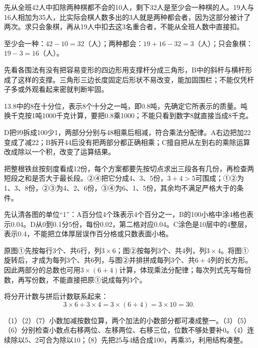 \documentclass[multi=snippet,border=0pt]{standalone}
\newenvironment{snippet}[3]{\begin{minipage}{#1bp}\color{answerred}\fontsize{#2}{#3}\selectfont\raggedright}{\end{minipage}}
\begin{document}
\begin{snippet}{505}{11.5}{14}先从全班42人中扣除两种棋都不会的10人，剩下32人是至少会一种棋的人。19人与16人相加为35人，比实际会棋人数多出的3人就是两种都会者，因为这部分被计了两次。求只会象棋，再从19人中扣去这3名重合者，不能从全班人数中直接扣。\par 至少会一种：\(42-10=32\)（人）；两种都会：\(19+16-32=3\)（人）；只会象棋：\(19-3=16\)（人）。\end{snippet}
\begin{snippet}{505}{11.5}{14}先看各围法有没有把容易变形的四边形用支撑杆分成三角形，B中的斜杆与横杆形成了这样的支撑。三角形三边长度固定后形状不易改变，能加固围栏；不能仅凭杆子多或外观看起来密就判断牢固。\end{snippet}
\begin{snippet}{505}{11.5}{14}13.8中的8在十分位，表示8个十分之一吨，即0.8吨，先确定它所表示的质量。吨换千克按1吨1000千克计算，要把0.8乘1000；不能只看到数字8就直接当成8千克。\end{snippet}
\begin{snippet}{505}{11.5}{14}D把99拆成100少1，两部分分别与48相乘后相减，符合乘法分配律。A右边把加22变成了减22；B拆开44后没有把两部分都正确相乘；C擅自把从左到右的乘除运算改成除以一个积，改变了运算结果。\end{snippet}
\begin{snippet}{505}{11.5}{14}把整根铁丝按刻度看成12份，每个方案都要先按切点求出三段各有几份，再检查两短段之和是否大于最长段。②④把它分成4、3、5份，\(3+4>5\)可围成；①②为1、3、8份，②③为4、2、6份，③④为6、1、5份，其余均不满足严格大于的条件。\end{snippet}
\begin{snippet}{505}{11.5}{14}先认清各图的单位“1”：A百分位4个珠表示4个百分之一，B的100小格中涂4格也表示0.04。D从0到0.1分5份，每份0.02，第二格对应0.04。C涂色是10层中的4整层，表示0.4，不能把立体厚层误作百分格或只数表面小格。\end{snippet}
\begin{snippet}{505}{11.5}{14}原图①先按每行3个、共6行，列\(3\times6\)；图②按每列3个、共4列，列\(3\times4\)。将图①旋转后，才成为每列3个、共6列，与图②并排拼成每列3个、共\(6+4\)列的长方形。因此两部分的总数也可用\(3\times(6+4)\)计算，体现乘法分配律；每次列式先写每份数，再写份数，不能直接把原①说成每列3个。\par 将分开计数与拼后计数联系起来：\[3\times6+3\times4=3\times(6+4)=3\times10=30.\]\end{snippet}
\begin{snippet}{505}{11.5}{14}（1）（2）（7）小数加减按数位算，两个加法的小数部分都可凑成整一。（3）（5）（6）分别检查小数点右移两位、左移两位、右移三位，位数不够处要补0。（4）连续除以5、2可合为除以10；（8）先把25与4结合成100，再乘35，利用结构凑整。\end{snippet}
\end{document}
